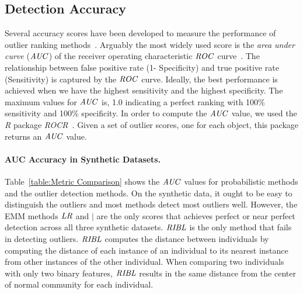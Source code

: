 {\subsection{Detection Accuracy} \label{sec:detection} Several accuracy scores have been developed to measure the performance of outlier ranking methods~\cite{aggarwal2013}. Arguably the most widely used score is the {\em area under curve} ($\it{AUC}$) of the receiver operating characteristic $\it{ROC}$ curve~\cite{Fawcett2006,Cansado2008,Muller2012}. 
		The relationship between false positive rate (1- Specificity) and true positive rate (Sensitivity) is captured by the $\it{ROC}$ curve. Ideally, the best performance is achieved when we have the highest sensitivity and the highest specificity. 
		The maximum values for $\it{AUC}$ is, 1.0 indicating a perfect ranking with 100\% sensitivity and 100\% specificity. In order to compute the $\it{AUC}$ value, we used the \textit{R} package \textit{ROCR}~\cite{RROCR2012}. Given a set of outlier scores, one for each object, this package returns an $\it{AUC}$ value. 



	\paragraph{AUC Accuracy in Synthetic Datasets.}
	Table~\ref{table:Metric Comparison} shows the $\it{AUC}$ values for probabilistic methods and the outlier detection methods. On the synthetic data, it ought to be easy to distinguish the outliers and most methods detect most outliers well.  However, the EMM methods $\it{LR}$ and $\mid$ are the only scores that achieves perfect or near perfect detection across all three synthetic datasets. $\it{RIBL}$ is the only method that fails in detecting outliers. $\it{RIBL}$ computes the distance between individuals by computing the distance of each instance of an individual to its nearest instance from other instances of the other individual. When comparing two individuals with only two binary features, $\it{RIBL}$ results in the same distance from the center of normal community for each individual.
	
}
